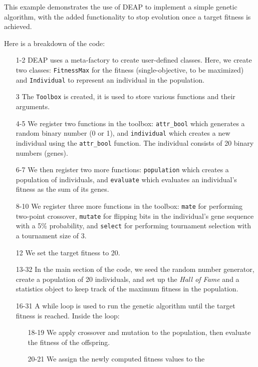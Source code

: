  This example demonstrates the use of DEAP to implement a simple genetic
  algorithm, with the added functionality to stop evolution once a target
  fitness is achieved.

  Here is a breakdown of the code:

  \begin{enumerate}
    \item[1-2] DEAP uses a meta-factory to create user-defined classes.
      Here, we create two classes: \texttt{FitnessMax} for the fitness
      (single-objective, to be maximized) and \texttt{Individual} to represent
      an individual in the population.
    \item[3] The \texttt{Toolbox} is created, it is used to store various
      functions and their arguments.
    \item[4-5] We register two functions in the toolbox: \texttt{attr\_bool} 
      which generates a random binary number (0 or 1), and \texttt{individual}
      which creates a new individual using the \texttt{attr\_bool} function.
      The individual consists of 20 binary numbers (genes).
    \item[6-7] We then register two more functions: \texttt{population} which
      creates a population of individuals, and \texttt{evaluate} which evaluates
      an individual's fitness as the sum of its genes.
    \item[8-10] We register three more functions in the toolbox: \texttt{mate}
      for performing two-point crossover, \texttt{mutate} for flipping bits in
      the individual's gene sequence with a 5\% probability, and \texttt{select}
      for performing tournament selection with a tournament size of 3.
    \item[12] We set the target fitness to 20. 
    \item[13-32] In the main section of the code, we seed the random number
      generator, create a population of 20 individuals, and set up the 
      \textit{Hall of Fame} and a statistics object to keep track of the maximum
      fitness in the population.
    \item[16-31] A while loop is used to run the genetic algorithm until the
      target fitness is reached. Inside the loop:
      \begin{enumerate}
        \item[18-19] We apply crossover and mutation to the population, then
          evaluate the fitness of the offspring.
        \item[20-21] We assign the newly computed fitness values to the

\end{enumerate}
\end{enumerate}

